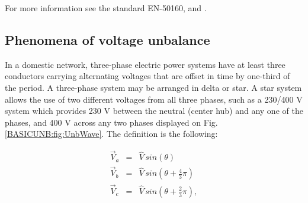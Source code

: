 For more information see the standard EN-50160, and \cite{cobben2012power}.\\

\subsection{Phenomena of voltage unbalance}\label{BASICUNB:sec:PhenomenafUNB}

In a domestic network, three-phase electric power systems have at least three conductors carrying alternating voltages that are offset in time by one-third of the period. A three-phase system may be arranged in delta  or star. A star system allows the use of two different voltages from all three phases, such as a 230/400 V system which provides 230 V between the neutral (center hub) and any one of the phases, and 400 V across any two phases displayed on Fig.\ref{BASICUNB:fig:UnbWave}. The definition is the following:
	
			\begin{equation}
        \begin{array}{rcl}
            \vec{V}_a&=&\hat{V}\,sin(\theta)\\
						\vec{V}_b&=&\hat{V}\,sin(\theta+\frac{4}{3}\pi)\\
						\vec{V}_c&=&\hat{V}\,sin(\theta+\frac{2}{3}\pi),\\
        \end{array}
        \label{BASICUNB:equ:Definition}
    \end{equation}
	
